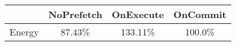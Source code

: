 \begin{tabular}{ l|ccc }
 & NoPrefetch & OnExecute & OnCommit\\ \hline
Energy
 & 87.43\% & 133.11\% & 100.0\%\\ \hline
\end{tabular}

